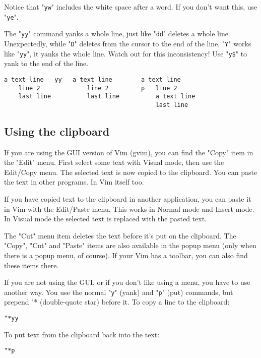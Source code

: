Notice that "\verb!yw!" includes the white space after a word.
If you don't want this, use "\verb!ye!".

The "\verb!yy!" command yanks a whole line, just like "\verb!dd!" deletes a whole line.
Unexpectedly, while "\verb!D!" deletes from the cursor to the end of the line, "\verb!Y!" works like "\verb!yy!", it yanks the whole line.
Watch out for this inconsistency!  Use "\verb!y$!" to yank to the end of the line.

		\begin{Verbatim}[samepage=true]
    a text line   yy   a text line        a text line
    line 2             line 2         p   line 2
    last line          last line          a text line
                                          last line
		\end{Verbatim}

\subsection{Using the clipboard}
\label{Using the clipboard}

If you are using the GUI version of Vim (gvim), you can find the "Copy" item in the "Edit" menu.
First select some text with Visual mode, then use the Edit/Copy menu.
The selected text is now copied to the clipboard.
You can paste the text in other programs.
In Vim itself too.

If you have copied text to the clipboard in another application, you can paste it in Vim with the Edit/Paste menu.
This works in Normal mode and Insert mode.
In Visual mode the selected text is replaced with the pasted text.

The "Cut" menu item deletes the text before it's put on the clipboard.
The "Copy", "Cut" and "Paste" items are also available in the popup menu (only when there is a popup menu, of course).
If your Vim has a toolbar, you can also find these items there.

If you are not using the GUI, or if you don't like using a menu, you have to use another way.
You use the normal "\verb!y!" (yank) and "\verb!p!" (put) commands, but prepend "* (double-quote star) before it.
To copy a line to the clipboard:

 \begin{Verbatim}[samepage=true]
 "*yy
 \end{Verbatim}

To put text from the clipboard back into the text:

 \begin{Verbatim}[samepage=true]
 "*p
 \end{Verbatim}

